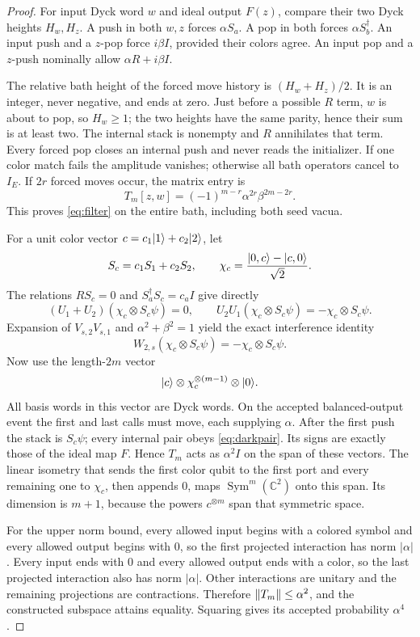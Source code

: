 \begin{proof}
For input Dyck word $w$ and ideal output $F(z)$, compare their two Dyck heights $H_w,H_z$. A push in both $w,z$ forces $\alpha S_a$. A pop in both forces $\alpha S_b^\dagger$. An input push and a $z$-pop force $i\beta I$, provided their colors agree. An input pop and a $z$-push nominally allow $\alpha R+i\beta I$.

The relative bath height of the forced move history is $(H_w+H_z)/2$. It is an integer, never negative, and ends at zero. Just before a possible $R$ term, $w$ is about to pop, so $H_w\ge1$; the two heights have the same parity, hence their sum is at least two. The internal stack is nonempty and $R$ annihilates that term. Every forced pop closes an internal push and never reads the initializer. If one color match fails the amplitude vanishes; otherwise all bath operators cancel to $I_E$. If $2r$ forced moves occur, the matrix entry is
\begin{equation}
 T_m[z,w]=(-1)^{m-r}\alpha^{2r}\beta^{2m-2r}.
 \label{eq:filterentry}
\end{equation}
This proves \eqref{eq:filter} on the entire bath, including both seed vacua.

For a unit color vector $c=c_1\lvert 1\rangle+c_2\lvert 2\rangle$, let
\[
 S_c=c_1S_1+c_2S_2,\qquad
 \chi_c=\frac{\lvert 0,c\rangle-\lvert c,0\rangle}{\sqrt2}.
\]
The relations $RS_c=0$ and $S_a^\dagger S_c=c_a I$ give directly
\[
 (U_1+U_2)(\chi_c\otimes S_c\psi)=0,\qquad
 U_2U_1(\chi_c\otimes S_c\psi)=-\chi_c\otimes S_c\psi.
\]
Expansion of $V_{s,2}V_{s,1}$ and $\alpha^2+\beta^2=1$ yield the exact interference identity
\begin{equation}
 W_{2,s}(\chi_c\otimes S_c\psi)=-\chi_c\otimes S_c\psi.
 \label{eq:darkpair}
\end{equation}
Now use the length-$2m$ vector
\[
 \lvert c\rangle\otimes\chi_c^{\otimes(m-1)}\otimes\lvert 0\rangle.
\]
All basis words in this vector are Dyck words. On the accepted balanced-output event the first and last calls must move, each supplying $\alpha$. After the first push the stack is $S_c\psi$; every internal pair obeys \eqref{eq:darkpair}. Its signs are exactly those of the ideal map $F$. Hence $T_m$ acts as $\alpha^2 I$ on the span of these vectors. The linear isometry that sends the first color qubit to the first port and every remaining one to $\chi_c$, then appends $0$, maps $\operatorname{Sym}^m(\mathbb C^2)$ onto this span. Its dimension is $m+1$, because the powers $c^{\otimes m}$ span that symmetric space.

For the upper norm bound, every allowed input begins with a colored symbol and every allowed output begins with $0$, so the first projected interaction has norm $|\alpha|$. Every input ends with $0$ and every allowed output ends with a color, so the last projected interaction also has norm $|\alpha|$. Other interactions are unitary and the remaining projections are contractions. Therefore $\lVert T_m\rVert\le\alpha^2$, and the constructed subspace attains equality. Squaring gives its accepted probability $\alpha^4$.
\end{proof}

